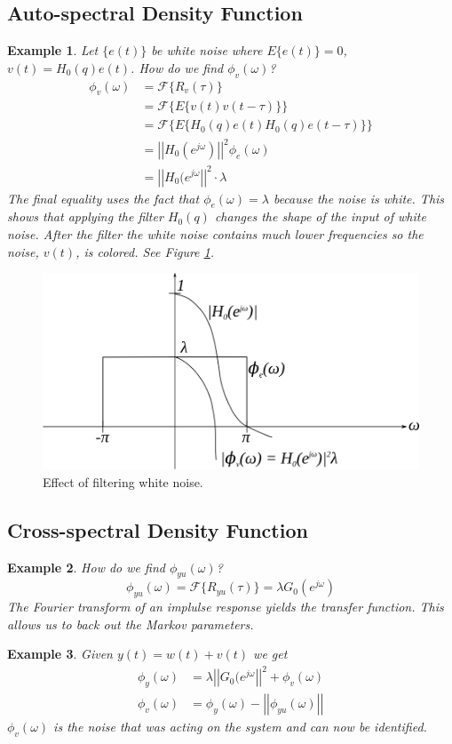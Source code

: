 \documentclass[lecture,12pt,]{pcms-l}
\theoremstyle{example}
\newtheorem{example}{Example}[section]
\newcommand{\vectornorm}[1]{\left|\left|#1\right|\right|}
\newcommand{\w}{\omega}
\begin{document}
\subsection{Auto-spectral Density Function}
\begin{example}
Let $\{e(t)\}$ be white noise where $E\{e(t)\}=0$, $v(t)=H_0(q)e(t)$. How do we find $\phi_v(\w)$?
\begin{align*}
\phi_v(\w) &= \mathcal{F}\{R_v(\tau)\} \\
&= \mathcal{F}\{E\{v(t)v(t-\tau)\}\} \\
&= \mathcal{F}\{E\{H_0(q)e(t)H_0(q)e(t-\tau)\}\} \\
&= \vectornorm{H_0(e^{j\w})}^2\phi_e(\w) \\
&= \vectornorm{H_0(e^{j\w}}^2\cdot\lambda
\end{align*}
The final equality uses the fact that $\phi_e(\w)=\lambda$ because the noise is white. This shows that applying the filter $H_0(q)$ changes the shape of the input of white noise. After the filter the white noise contains much lower frequencies so the noise, $v(t)$, is colored. See Figure \ref{fig:04filteredNoise}.
\end{example}
\begin{figure}[ht!]
	\centering
	\includegraphics[width=.7\textwidth]{images/04filteredNoise}
	\caption{Effect of filtering white noise.}
	\label{fig:04filteredNoise}
\end{figure}

\subsection{Cross-spectral Density Function}
\begin{example}
How do we find $\phi_{yu}(\w)$?
$$\phi_{yu}(\w) = \mathcal{F}\{R_{yu}(\tau)\} = \lambda G_0(e^{j\w})$$
The Fourier transform of an implulse response yields the transfer function. This allows us to back out the Markov parameters.
\end{example}

\begin{example}
Given $y(t)=w(t)+v(t)$ we get
\begin{align*}
\phi_y(\w) &= \lambda\vectornorm{G_0(e^{j\w}}^2 + \phi_v(\w) \\
\phi_v(\w) &= \phi_y(\w) - \vectornorm{\phi_{yu}(\w)}
\end{align*}
$\phi_v(\w)$ is the noise that was acting on the system and can now be identified.
\end{example}
\end{document}
